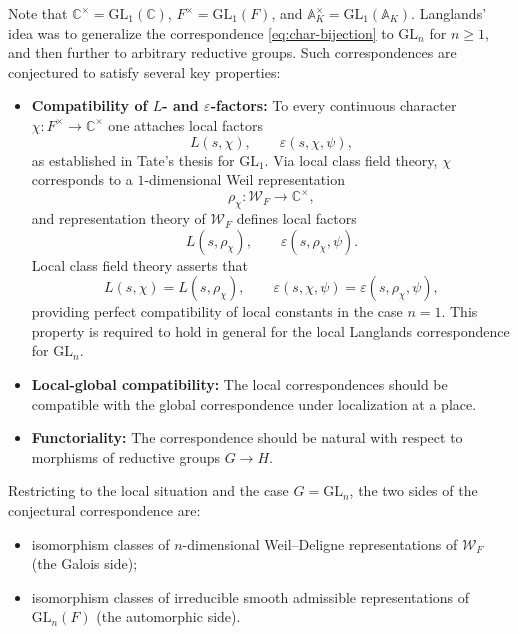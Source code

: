 \documentclass[11pt]{amsart}
\begin{document}
Note that \(\mathbb{C}^\times = \mathrm{GL}_1(\mathbb{C})\), 
\(F^\times = \mathrm{GL}_1(F)\), and 
\(\mathbb{A}_K^\times = \mathrm{GL}_1(\mathbb{A}_K)\).
Langlands’ idea was to generalize the correspondence 
\eqref{eq:char-bijection} to \(\mathrm{GL}_n\) for \(n \geq 1\), 
and then further to arbitrary reductive groups.
Such correspondences are conjectured to satisfy several key properties:
\begin{itemize}
    \item \textbf{Compatibility of $L$- and $\varepsilon$-factors:}
    To every continuous character \(\chi: F^\times \to \mathbb{C}^\times\)
    one attaches local factors
    \[
    L(s,\chi), \qquad \varepsilon(s,\chi,\psi),
    \]
    as established in Tate's thesis for \(\mathrm{GL}_1\).
    Via local class field theory, $\chi$ corresponds to a 
    $1$-dimensional Weil representation
    \[
    \rho_\chi : \mathcal{W}_F \longrightarrow \mathbb{C}^\times,
    \]
    and representation theory of $\mathcal{W}_F$ defines local factors
    \[
    L(s,\rho_\chi), \qquad \varepsilon(s,\rho_\chi,\psi).
    \]
    Local class field theory asserts that
    \[
    L(s,\chi) = L(s,\rho_\chi), \qquad 
    \varepsilon(s,\chi,\psi) = \varepsilon(s,\rho_\chi,\psi),
    \]
    providing perfect compatibility of local constants in the case 
    \(n = 1\). This property is required to hold in general for the 
    local Langlands correspondence for $\mathrm{GL}_n$.
    
    \item \textbf{Local-global compatibility:} 
    The local correspondences should be compatible with the global 
    correspondence under localization at a place.
    
    \item \textbf{Functoriality:} 
    The correspondence should be natural with respect to morphisms 
    of reductive groups \(G \to H\).
\end{itemize}

Restricting to the local situation and the case \(G = \mathrm{GL}_n\),
the two sides of the conjectural correspondence are:
\begin{itemize}
    \item isomorphism classes of $n$-dimensional Weil--Deligne representations 
    of $\mathcal{W}_F$ (the Galois side);
    \item isomorphism classes of irreducible smooth admissible representations 
    of $\mathrm{GL}_n(F)$ (the automorphic side).
\end{itemize}
\end{document}
